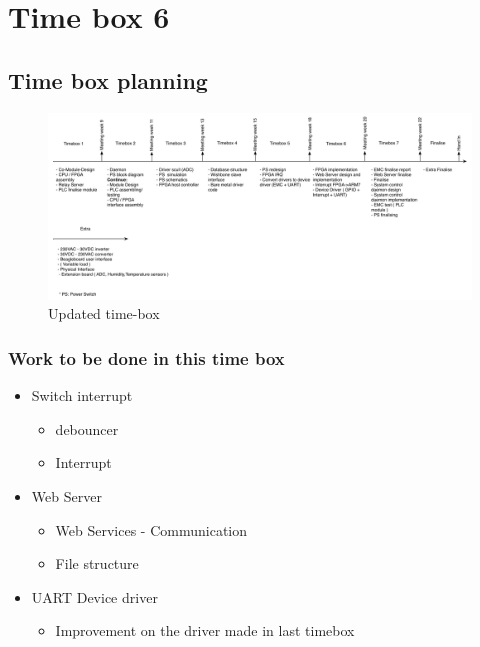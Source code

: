 \section{Time box 6}
\subsection{Time box planning}

\begin{figure}[H]
	\begin{centering}
		\includegraphics[width=1.0\textwidth]{images/tb_r6.png}
		\caption{Updated time-box}
	\end{centering}
\end{figure}

\subsubsection{Work to be done in this time box}
\begin{itemize}
	\item Switch interrupt
	\begin{itemize}
		\item debouncer
		\item Interrupt
	\end{itemize}
	\item Web Server
		\begin{itemize}
			\item Web Services - Communication
			\item File structure
		\end{itemize}
	\item UART Device driver
	\begin{itemize}
		\item Improvement on the driver made in last timebox
	\end{itemize}
\end{itemize}

